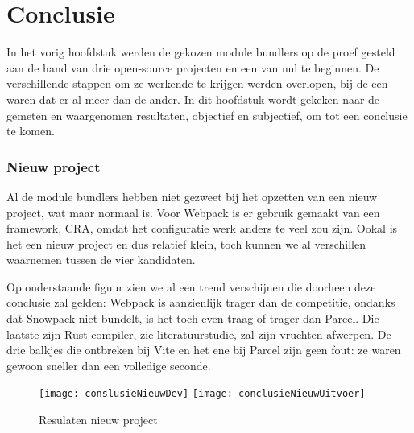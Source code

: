 
\chapter{Conclusie}
\label{ch:conclusie}


In het vorig hoofdstuk werden de gekozen module bundlers op de proef gesteld aan de hand van drie open-source projecten en een van nul te beginnen. De verschillende stappen om ze werkende te krijgen werden overlopen, bij de een waren dat er al meer dan de ander. In dit hoofdstuk wordt gekeken naar de gemeten en waargenomen resultaten, objectief en subjectief, om tot een conclusie te komen.

\subsection{Nieuw project}

Al de module bundlers hebben niet gezweet bij het opzetten van een nieuw project, wat maar normaal is. Voor Webpack is er gebruik gemaakt van een framework, CRA, omdat het configuratie werk anders te veel zou zijn. Ookal is het een nieuw project en dus relatief klein, toch kunnen we al verschillen waarnemen tussen de vier kandidaten. 

Op onderstaande figuur zien we al een trend verschijnen die doorheen deze conclusie zal gelden: Webpack is aanzienlijk trager dan de competitie, ondanks dat Snowpack niet bundelt, is het toch even traag of trager dan Parcel. Die laatste zijn Rust compiler, zie literatuurstudie, zal zijn vruchten afwerpen. De drie balkjes die ontbreken bij Vite en het ene bij Parcel zijn geen fout: ze waren gewoon sneller dan een volledige seconde. 

\begin{figure}[h]
    \texttt{[image: conslusieNieuwDev]}
        \centering
        \texttt{[image: conclusieNieuwUitvoer]}
        \centering
        \caption{Resulaten nieuw project}
    \end{figure}


